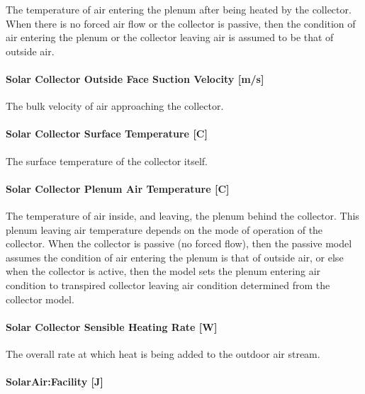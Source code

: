 The temperature of air entering the plenum after being heated by the collector. When there is no forced air flow or the collector is passive, then the condition of air entering the plenum or the collector leaving air is assumed to be that of outside air.

\paragraph{Solar Collector Outside Face Suction Velocity {[}m/s{]}}\label{solar-collector-outside-face-suction-velocity-ms}

The bulk velocity of air approaching the collector.

\paragraph{Solar Collector Surface Temperature {[}C{]}}\label{solar-collector-surface-temperature-c}

The surface temperature of the collector itself.

\paragraph{Solar Collector Plenum Air Temperature {[}C{]}}\label{solar-collector-plenum-air-temperature-c}

The temperature of air inside, and leaving, the plenum behind the collector. This plenum leaving air temperature depends on the mode of operation of the collector. When the collector is passive (no forced flow), then the passive model assumes the condition of air entering the plenum is that of outside air, or else when the collector is active, then the model sets the plenum entering air condition to transpired collector leaving air condition determined from the collector model.

\paragraph{Solar Collector Sensible Heating Rate {[}W{]}}\label{solar-collector-sensible-heating-rate-w}

The overall rate at which heat is being added to the outdoor air stream.

\paragraph{SolarAir:Facility {[}J{]}}\label{solarairfacility-j}

